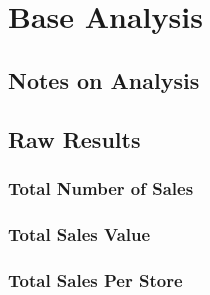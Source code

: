 \documentclass{article}
\begin{document}
    \section{Base Analysis}
    \label{sec:BA}

        \subsection{Notes on Analysis}

            \subsection{Raw Results}


            \subsubsection{Total Number of Sales}
            \subsubsection{Total Sales Value}
            \subsubsection{Total Sales Per Store}
\end{document}
